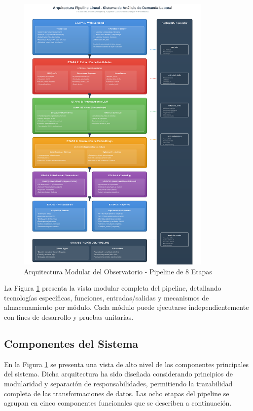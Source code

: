\begin{figure}[H]
\centering
\includegraphics[width=0.85\textwidth]{diagrams/pipeline_arquitectura.png}
\caption{Arquitectura Modular del Observatorio - Pipeline de 8 Etapas}
\label{fig:arquitectura-completa}
\end{figure}

La Figura \ref{fig:arquitectura-completa} presenta la vista modular completa del pipeline, detallando tecnologías específicas, funciones, entradas/salidas y mecanismos de almacenamiento por módulo. Cada módulo puede ejecutarse independientemente con fines de desarrollo y pruebas unitarias.

\subsection{Componentes del Sistema}

En la Figura \ref{fig:arquitectura-completa} se presenta una vista de alto nivel de los componentes principales del sistema. Dicha arquitectura ha sido diseñada considerando principios de modularidad y separación de responsabilidades, permitiendo la trazabilidad completa de las transformaciones de datos. Las ocho etapas del pipeline se agrupan en cinco componentes funcionales que se describen a continuación.

